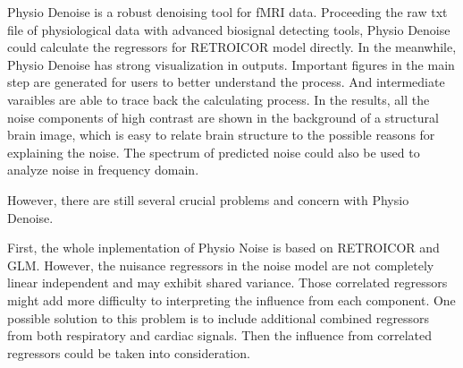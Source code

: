 Physio Denoise is a robust denoising tool for fMRI data. 
Proceeding the raw txt file of physiological data with advanced biosignal detecting tools, 
Physio Denoise could calculate the regressors for RETROICOR model directly.
In the meanwhile, Physio Denoise has strong visualization in outputs.
Important figures in the main step are generated for users to better understand the process.
And intermediate varaibles are able to trace back the calculating process.
In the results, all the noise components of high contrast 
are shown in the background of a structural brain image, which
is easy to relate brain structure to the possible reasons for explaining the noise.
The spectrum of predicted noise could also be used to analyze noise in frequency domain.

However, there are still several crucial problems and concern with Physio Denoise.

First, the whole inplementation of Physio Noise is based on RETROICOR and GLM. 
However, the nuisance regressors in the noise model are not completely linear independent 
and may exhibit shared variance.\cite{bright2017potential} Those correlated regressors might 
add more difficulty to interpreting the influence from each component.
One possible solution to this problem is to include additional combined regressors from
both respiratory and cardiac signals. Then the influence from correlated regressors 
could be taken into consideration. 

